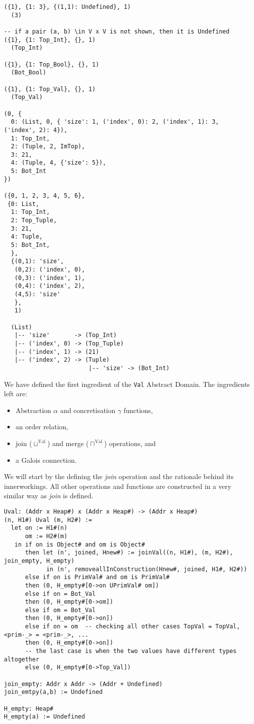 \begin{verbatim}
({1}, {1: 3}, {(1,1): Undefined}, 1)
  (3)

-- if a pair (a, b) \in V x V is not shown, then it is Undefined
({1}, {1: Top_Int}, {}, 1)
  (Top_Int)

({1}, {1: Top_Bool}, {}, 1)
  (Bot_Bool)

({1}, {1: Top_Val}, {}, 1)
  (Top_Val)

(0, {
  0: (List, 0, { 'size': 1, ('index', 0): 2, ('index', 1): 3, ('index', 2): 4}),
  1: Top_Int,
  2: (Tuple, 2, ImTop),
  3: 21,
  4: (Tuple, 4, {'size': 5}),
  5: Bot_Int
})

({0, 1, 2, 3, 4, 5, 6},
 {0: List,
  1: Top_Int,
  2: Top_Tuple,
  3: 21,
  4: Tuple,
  5: Bot_Int,
  },
  {(0,1): 'size',
   (0,2): ('index', 0),
   (0,3): ('index', 1),
   (0,4): ('index', 2),
   (4,5): 'size'
   },
   1)

  (List)
   |-- 'size'       -> (Top_Int)
   |-- ('index', 0) -> (Top_Tuple)
   |-- ('index', 1) -> (21)
   |-- ('index', 2) -> (Tuple)
                        |-- 'size' -> (Bot_Int)
\end{verbatim}

We have defined the first ingredient of the \texttt{Val} Abstract
Domain. The ingredients left are:

\begin{itemize}
\tightlist
\item
  Abstraction \(\alpha{}\) and concretisation \(\gamma{}\) functions,
\item
  an order relation,
\item
  join (\(\sqcup^{\text{Val}}\)) and merge (\(\sqcap^{\text{Val}}\))
  operations, and
\item
  a Galois connection.
\end{itemize}

{}

We will start by the defining the \emph{join} operation and the
rationale behind its innerworkings. All other operations and functions
are constructed in a very similar way as \emph{join} is defined.

\begin{verbatim}
Uval: (Addr x Heap#) x (Addr x Heap#) -> (Addr x Heap#)
(n, H1#) Uval (m, H2#) :=
  let on := H1#(n)
      om := H2#(m)
   in if on is Object# and om is Object#
      then let (n', joined, Hnew#) := joinVal((n, H1#), (m, H2#), join_empty, H_empty)
            in (n', removeallInConstruction(Hnew#, joined, H1#, H2#))
      else if on is PrimVal# and om is PrimVal#
      then (0, H_empty#[0->on UPrimVal# om])
      else if on = Bot_Val
      then (0, H_empty#[0->om])
      else if om = Bot_Val
      then (0, H_empty#[0->on])
      else if on = om  -- checking all other cases TopVal = TopVal, <prim-_> = <prim-_>, ...
      then (0, H_empty#[0->on])
      -- the last case is when the two values have different types altogether
      else (0, H_empty#[0->Top_Val])

join_empty: Addr x Addr -> (Addr + Undefined)
join_emtpy(a,b) := Undefined

H_empty: Heap#
H_empty(a) := Undefined
\end{verbatim}

